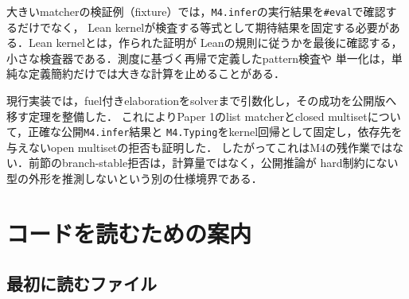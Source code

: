 \documentclass[11pt,a4paper,oneside]{ltjsbook}
\newcommand{\code}[1]{\texttt{#1}}
\begin{document}
大きいmatcherの検証例（fixture）では，\code{M4.infer}の実行結果を\code{\#eval}で確認するだけでなく，
Lean kernelが検査する等式として期待結果を固定する必要がある．Lean kernelとは，作られた証明が
Leanの規則に従うかを最後に確認する，小さな検査器である．測度に基づく再帰で定義したpattern検査や
単一化は，単純な定義簡約だけでは大きな計算を止めることがある．

現行実装では，fuel付きelaborationをsolverまで引数化し，その成功を公開版へ移す定理を整備した．
これによりPaper 1のlist matcherとclosed multisetについて，正確な公開\code{M4.infer}結果と
\code{M4.Typing}をkernel回帰として固定し，依存先を与えないopen multisetの拒否も証明した．
したがってこれはM4の残作業ではない．前節のbranch-stable拒否は，計算量ではなく，公開推論が
hard制約にない型の外形を推測しないという別の仕様境界である．

\chapter{コードを読むための案内}

\section{最初に読むファイル}
\end{document}
